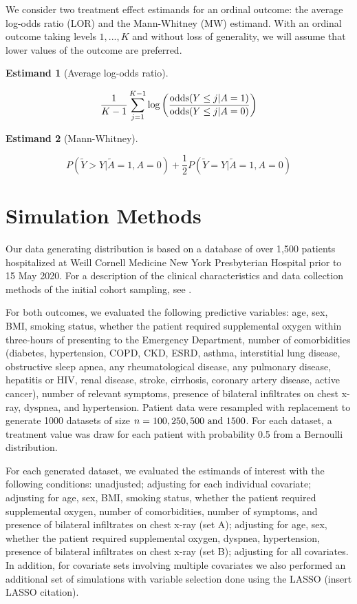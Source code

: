 \documentclass{article}
\begin{document}
\newtheorem{ord}{Estimand}

We consider two treatment effect estimands for an ordinal outcome: the average log-odds ratio (LOR) and the Mann-Whitney (MW) estimand. With an ordinal outcome taking levels $1, ..., K$ and without loss of generality, we will assume that lower values of the outcome are preferred. 

\begin{ord}[Average log-odds ratio]
\label{lor}
\end{ord}
\[\frac{1}{K - 1} \sum_{j = 1}^{K - 1}\textnormal{log} \left( \frac{\textnormal{odds}(Y \leq j | A = 1)}{\textnormal{odds}(Y \leq j | A = 0)} \right)\]

\begin{ord}[Mann-Whitney]
\label{MW}
\end{ord}
\[ P(\tilde{Y} > Y|\tilde{A} = 1, A = 0) + \frac{1}{2}P(\tilde{Y} = Y | \tilde{A} = 1, A = 0) \]

\section{Simulation Methods}

Our data generating distribution is based on a database of over 1,500 patients hospitalized at Weill Cornell Medicine New York Presbyterian Hospital prior to 15 May 2020. For a description of the clinical characteristics and data collection methods of the initial cohort sampling, see \citet{goyalNEJM}.

For both outcomes, we evaluated the following predictive variables: age, sex, BMI, smoking status, whether the patient required supplemental oxygen within three-hours of presenting to the Emergency Department, number of comorbidities (diabetes, hypertension, COPD, CKD, ESRD, asthma, interstitial lung disease, obstructive sleep apnea, any rheumatological disease, any pulmonary disease, hepatitis or HIV, renal disease, stroke, cirrhosis, coronary artery disease, active cancer), number of relevant symptoms, presence of bilateral infiltrates on chest x-ray, dyspnea, and hypertension. Patient data were resampled with replacement to generate 1000 datasets of size $n = 100, 250, 500 \textnormal{ and } 1500$. For each dataset, a treatment value was draw for each patient with probability 0.5 from a Bernoulli distribution.

For each generated dataset, we evaluated the estimands of interest with the following conditions: unadjusted;  adjusting for each individual covariate; adjusting for age, sex, BMI, smoking status, whether the patient required supplemental oxygen, number of comorbidities, number of symptoms, and presence of bilateral infiltrates on chest x-ray (set A); adjusting for age, sex, whether the patient required supplemental oxygen, dyspnea, hypertension, presence of bilateral infiltrates on chest x-ray (set B); adjusting for all covariates. In addition, for covariate sets involving multiple covariates we also performed an additional set of simulations with variable selection done using the LASSO (insert LASSO citation).
\end{document}
